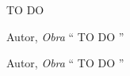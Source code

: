 \documentclass[tcc]{ic}
\begin{document}

\capa

\begin{agradecimentos}

TO DO


\vspace{2em}
\begin{epigraph}{Autor, \textit{Obra}}
`` TO DO ''
\end{epigraph}



\newpage
\thispagestyle{empty}
\vspace*{\fill}
\begin{epigraph}{Autor, \textit{Obra}}
`` TO DO ''
\end{epigraph}

\begin{resumo}


\end{resumo}
\end{agradecimentos}
\end{document}
